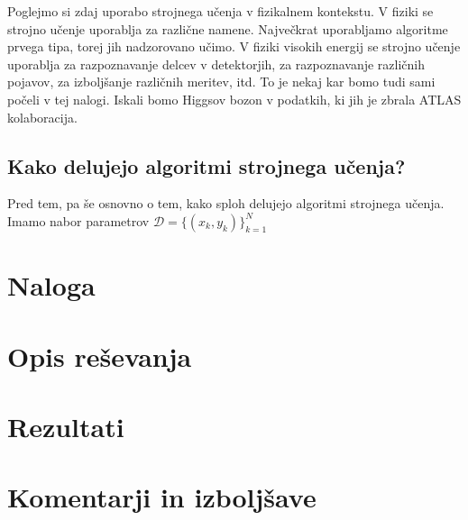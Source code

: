 \documentclass[a4paper]{article}
\begin{document}
Poglejmo si zdaj uporabo strojnega učenja v fizikalnem kontekstu. V fiziki se strojno učenje uporablja za različne
namene. Največkrat uporabljamo algoritme prvega tipa, torej jih nadzorovano učimo. V fiziki visokih energij se strojno
učenje uporablja za razpoznavanje delcev v detektorjih, za razpoznavanje različnih pojavov, za izboljšanje različnih 
meritev, itd. To je nekaj kar bomo tudi sami počeli v tej nalogi. Iskali bomo Higgsov bozon v podatkih, ki jih je
zbrala ATLAS kolaboracija. \\

\subsection{Kako delujejo algoritmi strojnega učenja?}
Pred tem, pa še osnovno o tem, kako sploh delujejo algoritmi strojnega učenja. Imamo nabor parametrov $\mathcal{D} = 
\{(x_k, y_k)\}_{k=1}^N$


\section{Naloga}

\section{Opis reševanja}

\section{Rezultati}


\section{Komentarji in izboljšave}


\newpage


\end{document}
